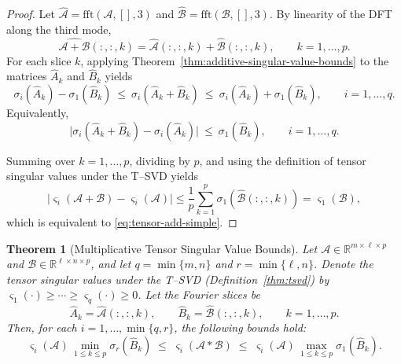 \documentclass{article}
\theoremstyle{plain}
\newtheorem{theorem}{Theorem}
\theoremstyle{definition}
\theoremstyle{remark}
\begin{document}
\begin{proof}
Let $\widehat{\mathcal A}=\mathrm{fft}(\mathcal A,[],3)$ and
$\widehat{\mathcal B}=\mathrm{fft}(\mathcal B,[],3)$.
By linearity of the DFT along the third mode,
\[
\widehat{\mathcal A+\mathcal B}(:,:,k)
=
\widehat{\mathcal A}(:,:,k)+\widehat{\mathcal B}(:,:,k),
\qquad k=1,\dots,p.
\]
For each slice $k$, applying Theorem~\ref{thm:additive-singular-value-bounds}
to the matrices $\widehat A_k$ and $\widehat B_k$ yields
\[
\sigma_i(\widehat A_k)-\sigma_1(\widehat B_k)
\ \le\
\sigma_i(\widehat A_k+\widehat B_k)
\ \le\
\sigma_i(\widehat A_k)+\sigma_1(\widehat B_k),
\qquad i=1,\dots,q.
\]
Equivalently,
\[
\bigl|\sigma_i(\widehat A_k+\widehat B_k)-\sigma_i(\widehat A_k)\bigr|
\ \le\
\sigma_1(\widehat B_k),
\qquad i=1,\dots,q.
\]

Summing over $k=1,\dots,p$, dividing by $p$, and using the definition of
tensor singular values under the T--SVD yields
\[
\bigl|\varsigma_i(\mathcal A+\mathcal B)-\varsigma_i(\mathcal A)\bigr|
\le
\frac{1}{p}\sum_{k=1}^p \sigma_1(\widehat{\mathcal B}(:,:,k))
=
\varsigma_1(\mathcal B),
\]
which is equivalent to \eqref{eq:tensor-add-simple}.
\end{proof}

\begin{theorem}[Multiplicative Tensor Singular Value Bounds]
\label{thm:tensor-mult-sv-both}
Let $\mathcal{A}\in\mathbb{R}^{m\times \ell\times p}$ and 
$\mathcal{B}\in\mathbb{R}^{\ell\times n\times p}$, and let 
$q=\min\{m,n\}$ and $r=\min\{\ell,n\}$.  
Denote the tensor singular values under the T--SVD 
(Definition~\ref{thm:tsvd}) by
\(\varsigma_1(\cdot)\ge\cdots\ge \varsigma_q(\cdot)\ge 0\).
Let the Fourier slices be
\[
\widehat{A}_k = \widehat{\mathcal{A}}(:,:,k), 
\qquad 
\widehat{B}_k = \widehat{\mathcal{B}}(:,:,k), 
\qquad k=1,\dots,p.
\]
Then, for each $i=1,\dots,\min\{q,r\}$, the following bounds hold:
\begin{equation}
\label{eq:tensor-mult-sv-both}
\varsigma_i(\mathcal{A})\,
\min_{1\le k\le p}\sigma_r(\widehat{B}_k)
\;\le\;
\varsigma_i(\mathcal{A} * \mathcal{B})
\;\le\;
\varsigma_i(\mathcal{A})\,
\max_{1\le k\le p}\sigma_1(\widehat{B}_k).
\end{equation}
\end{theorem}
\end{document}
